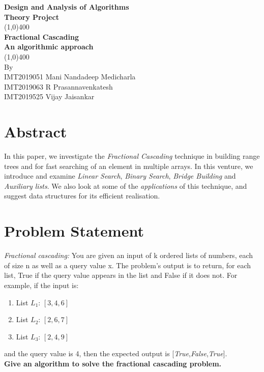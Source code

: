 \documentclass[11pt]{article}
\begin{document}
\begin{titlepage}
\begin{center}
\vspace*{0.5cm}
\Large{\textbf{Design and Analysis of Algorithms}}\\
\Large{\textbf{Theory Project}}\\
\vfill
\line(1,0){400}\\[1mm]
\huge{\textbf{Fractional Cascading}}\\[3mm]
\Large{\textbf{An algorithmic approach}}\\[1mm]
\line(1,0){400}\\
\vfill
By \\ 
IMT2019051 Mani Nandadeep Medicharla \\
IMT2019063 R Prasannavenkatesh \\
IMT2019525 Vijay Jaisankar \\
\end{center}
\end{titlepage}

\tableofcontents
\thispagestyle{empty}
\clearpage
\setcounter{page}{1}

\section{Abstract}
        In this paper, we investigate the \textit{Fractional Cascading} technique in building range trees and for fast searching of an element in multiple arrays. In this venture, we introduce and examine \textit{Linear Search}, \textit{Binary Search}, \textit{Bridge Building} and \textit{Auxiliary lists}. We also look at some of the \textit{applications} of this technique, and suggest data structures for its efficient realisation. 

\section{Problem Statement}
\textit{Fractional cascading: }You are given an input of k ordered lists of numbers, each of size n as well as a query value x. The problem's output is
to return, for each list, True if the query value appears in the list and
False if it does not. For example, if the input is:
\begin{enumerate}[label=(\alph*)]
    \item List $L_1$: $[3,4,6]$
    \item List $L_2$: $[2,6,7]$
    \item List $L_3$: $[2,4,9]$
\end{enumerate}
and the query value is 4, then the expected output is [\textit{True},\textit{False},\textit{True}]. \\
\textbf{Give an algorithm to solve the fractional cascading problem.}
\end{document}
